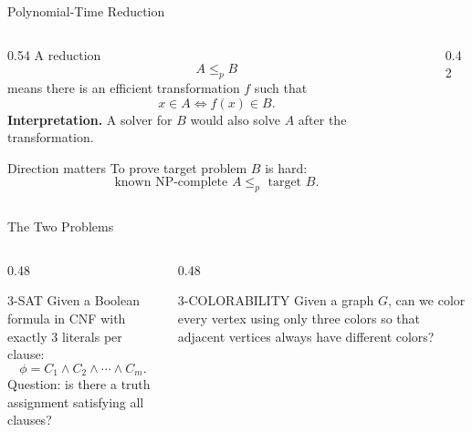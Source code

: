 \documentclass[aspectratio=43,8pt]{beamer}
\begin{document}
\begin{frame}{Polynomial-Time Reduction}
\begin{columns}[T]
\begin{column}{0.54\textwidth}
A reduction
\[
A \le_p B
\]
means there is an efficient transformation $f$ such that
\[
x\in A \iff f(x)\in B.
\]
\vspace{0.15cm}
\textbf{Interpretation.} A solver for $B$ would also solve $A$ after the transformation.
\vspace{0.25cm}
\begin{block}{Direction matters}
To prove target problem $B$ is hard:
\[
\text{known NP-complete } A \le_p \text{ target } B.
\]
\end{block}
\end{column}
\begin{column}{0.42\textwidth}
\centering
{}
\end{column}
\end{columns}
\end{frame}

\begin{frame}{The Two Problems}
\begin{columns}[T]
\begin{column}{0.48\textwidth}
\begin{block}{3-SAT}
Given a Boolean formula in CNF with exactly 3 literals per clause:
\[
\phi=C_1\land C_2\land\cdots\land C_m.
\]
Question: is there a truth assignment satisfying all clauses?
\end{block}
\end{column}
\begin{column}{0.48\textwidth}
\begin{block}{3-COLORABILITY}
Given a graph $G$, can we color every vertex using only three colors so that adjacent vertices always have different colors?
\end{block}
\end{column}
\end{columns}
\vspace{0.25cm}
\begin{center}
\end{center}
\end{frame}
\end{document}
